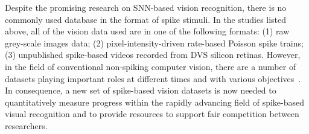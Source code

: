 Despite the promising research on SNN-based vision recognition, there is no commonly used database in the format of spike stimuli.
In the studies listed above, all of the vision data used are in one of the following formats:
(1) raw grey-scale images data;
(2) pixel-intensity-driven rate-based Poisson spike trains;
(3) unpublished spike-based videos recorded from DVS silicon retinas.
However, in the field of conventional non-spiking computer vision, there are a number of datasets playing important roles at different times and with various objectives~\citep{lecun1998gradient,deng2009imagenet,blank2005actions,liu2009recognizing}.
In consequence, a new set of spike-based vision datasets is now needed to quantitatively measure progress within the rapidly advancing field of spike-based visual recognition and to provide resources to support fair competition between researchers.


